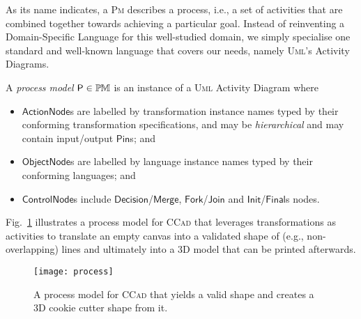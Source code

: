 
\medskip
As its name indicates, a \textsc{Pm} describes a process, i.e., a set of 
activities that are combined together towards achieving a particular goal. 
Instead of reinventing a Domain-Specific Language for this well-studied domain, 
we simply specialise one standard and well-known language that covers our 
needs, namely \textsc{Uml}'s Activity Diagrams.


\begin{Definition}
A \emph{process model} $\mathsf{P}\in\mathbb{P}\mskip-1mu\mathbb{M}$ is an instance of a \textsc{Uml}
Activity Diagram where
\begin{itemize}
   \item $\mathsf{ActionNode}$s are labelled by transformation instance names 
typed by their conforming transformation specifications, and may be 
\emph{hierarchical} and may contain input/output $\mathsf{Pin}$s; and 
   \item $\mathsf{ObjectNode}$s are labelled by language instance names typed 
by their conforming languages; and 
   \item $\mathsf{ControlNode}$s include 
$\mathsf{Decision}$/$\mathsf{Merge}$, $\mathsf{Fork}$/$\mathsf{Join}$ and 
$\mathsf{Init}$/$\mathsf{Final}$s nodes.   
\end{itemize}
\end{Definition}

Fig.~\ref{fig:Process} illustrates a process model for \textsc{CCad} that
leverages transformations as activities to translate an empty canvas into a
validated shape of (e.g., non-overlapping) lines and ultimately into a 3D model
that can be printed afterwards.
 
\begin{figure}[t]
\centering 
\texttt{[image: process]}
\vspace{-1em}
\caption{A process model for \textsc{CCad} that yields a valid shape and
   creates a 3D cookie cutter shape from it.} 
\label{fig:Process}%
\end{figure}

